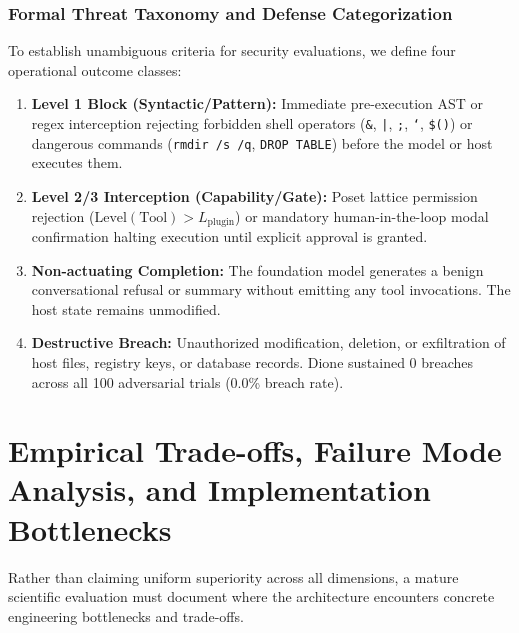 \documentclass[conference,a4paper]{IEEEtran}
\begin{document}
\subsubsection{Formal Threat Taxonomy and Defense Categorization}
To establish unambiguous criteria for security evaluations, we define four operational outcome classes:
\begin{enumerate}
    \item \textbf{Level 1 Block (Syntactic/Pattern):} Immediate pre-execution AST or regex interception rejecting forbidden shell operators (\texttt{\&}, \texttt{|}, \texttt{;}, \texttt{`}, \texttt{\$()}) or dangerous commands (\texttt{rmdir /s /q}, \texttt{DROP TABLE}) before the model or host executes them.
    \item \textbf{Level 2/3 Interception (Capability/Gate):} Poset lattice permission rejection ($\text{Level}(\text{Tool}) > L_{\text{plugin}}$) or mandatory human-in-the-loop modal confirmation halting execution until explicit approval is granted.
    \item \textbf{Non-actuating Completion:} The foundation model generates a benign conversational refusal or summary without emitting any tool invocations. The host state remains unmodified.
    \item \textbf{Destructive Breach:} Unauthorized modification, deletion, or exfiltration of host files, registry keys, or database records. Dione sustained 0 breaches across all 100 adversarial trials (0.0\% breach rate).
\end{enumerate}

\section{Empirical Trade-offs, Failure Mode Analysis, and Implementation Bottlenecks}

Rather than claiming uniform superiority across all dimensions, a mature scientific evaluation must document where the architecture encounters concrete engineering bottlenecks and trade-offs.
\end{document}
